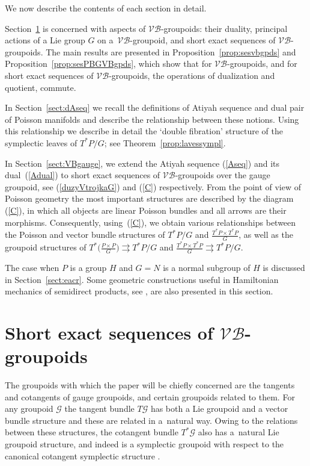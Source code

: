 \documentclass[pdftex]{sigma}
\newcommand{\tto}{\rightrightarrows}
\newcommand{\gold}{\mscr{G}}
\newcommand{\mscr}[1]{\mathscr{#1}}
\numberwithin{equation}{section}
\begin{document}
We now describe the contents of each section in detail.

Section~\ref{sect:prelims} is concerned with aspects of $\mathcal{V}\!\mathcal{B}$-groupoids: their duality, principal actions of a Lie group $G$ on a~$\mathcal{V}\!\mathcal{B}$-groupoid, and short exact sequences of $\mathcal{V}\!\mathcal{B}$-groupoids. The main results are presented in Proposition~\ref{prop:sesvbgpds} and Proposition~\ref{prop:sesPBGVBgpds}, which show that for $\mathcal{V}\!\mathcal{B}$-groupoids, and for short exact sequences of $\mathcal{V}\!\mathcal{B}$-groupoids, the operations of dualization and quotient, commute.

In Section~\ref{sect:dAseq} we recall the def\/initions of Atiyah sequence and dual pair of Poisson manifolds and describe the relationship between these notions. Using this relationship we describe in detail the `double f\/ibration' structure of the symplectic leaves of $T^*P/G$; see Theorem~\ref{prop:lavessympl}.

In Section~\ref{sect:VBgauge}, we extend the Atiyah sequence (\ref{Aseq}) and its dual~(\ref{Adual}) to short exact sequences of $\mathcal{V}\!\mathcal{B}$-groupoids over the gauge groupoid, see (\ref{duzyVtrojkaG}) and (\ref{C}) respectively. From the point of view of Poisson geometry the most important structures are described by the diagram (\ref{C}), in which all objects are linear Poisson bundles and all arrows are their morphisms. Consequently, using~(\ref{C}), we obtain various relationships between the Poisson and vector bundle structures of $T^*P/G$ and $\frac{T^*P\times T^*P}{G}$, as well as the groupoid structures of $T^*\big(\frac{P\times P}{G}\big)\tto T^*P/G$ and $\frac{T^*P\times T^*P}{G}\tto T^*P/G$.

The case when $P$ is a group $H$ and $G=N$ is a normal subgroup of $H$ is discussed in Section~\ref{sect:eacr}. Some geometric constructions useful in Hamiltonian mechanics of semidirect products, see \cite{ratiu1, holm, ratiu2, ReymanSTS}, are also presented in this section.

\section[Short exact sequences of $\mathcal{V}\!\mathcal{B}$-groupoids]{Short exact sequences of $\boldsymbol{\mathcal{V}\!\mathcal{B}}$-groupoids}\label{sect:prelims}

The groupoids with which the paper will be chief\/ly concerned are the tangents and cotangents of gauge groupoids, and certain groupoids related to them. For any groupoid $\gold$ the tangent bundle $T\gold$ has both a Lie groupoid and a vector bundle structure and these are related in a~natural way. Owing to the relations between these structures, the cotangent bundle $T^*\gold$ also has a~natural Lie groupoid structure, and indeed is a symplectic groupoid with respect to the canonical cotangent symplectic structure \cite{CDW}.
\end{document}
